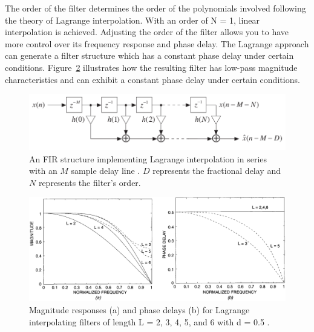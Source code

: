 \documentclass[main.tex]{subfiles}
\begin{document}
The order of the filter determines the order of the polynomials involved following the theory of Lagrange interpolation. With an order of N = 1, linear interpolation is achieved. Adjusting the order of the filter allows you to have more control over its frequency response and phase delay. The Lagrange approach can generate a filter structure which has a constant phase delay under certain conditions. Figure~\ref{fig:LagrangeResponses} illustrates how the resulting filter has low-pass magnitude characteristics and can exhibit a constant phase delay under certain conditions.

\begin{figure}[h]
    \centering
    \includegraphics[scale=.65]{./images/diagrams/LagrangeStructure.png}
    \caption{An FIR structure implementing Lagrange interpolation in series with an $M$ sample delay line . $D$ represents the fractional delay and $N$ represents the filter's order.}
    \label{fig:LagrangeStructure}
\end{figure}

\begin{figure}[h]
    \centering
    \includegraphics[scale=.65]{./images/plots/LagrangeResponses.png}
    \caption{Magnitude responses (a) and phase delays (b) for Lagrange interpolating filters of length L = 2, 3, 4, 5, and 6 with d = 0.5 .}
    \label{fig:LagrangeResponses}
\end{figure}
\end{document}
